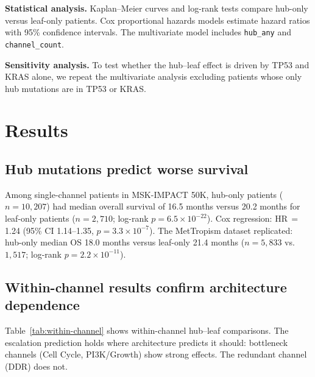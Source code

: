 \documentclass[11pt]{article}
\begin{document}
\textbf{Statistical analysis.}
Kaplan--Meier curves and log-rank tests compare hub-only versus
leaf-only patients. Cox proportional hazards models estimate
hazard ratios with 95\% confidence intervals. The multivariate
model includes \texttt{hub\_any} and \texttt{channel\_count}.

\textbf{Sensitivity analysis.}
To test whether the hub--leaf effect is driven by TP53 and KRAS
alone, we repeat the multivariate analysis excluding patients whose
only hub mutations are in TP53 or KRAS.

\section{Results}
\label{sec:results}

\subsection{Hub mutations predict worse survival}
\label{sec:hub-leaf}

Among single-channel patients in MSK-IMPACT 50K, hub-only patients
($n = 10{,}207$) had median overall survival of 16.5 months versus
20.2 months for leaf-only patients ($n = 2{,}710$; log-rank
$p = 6.5 \times 10^{-22}$). Cox regression: HR\,$=$\,1.24 (95\% CI
1.14--1.35, $p = 3.3 \times 10^{-7}$). The MetTropism dataset
replicated: hub-only median OS 18.0 months versus leaf-only
21.4 months ($n = 5{,}833$ vs.\ $1{,}517$; log-rank
$p = 2.2 \times 10^{-11}$).

\subsection{Within-channel results confirm architecture dependence}

Table~\ref{tab:within-channel} shows within-channel hub--leaf
comparisons. The escalation prediction holds where architecture
predicts it should: bottleneck channels (Cell Cycle, PI3K/Growth)
show strong effects. The redundant channel (DDR) does not.
\end{document}

